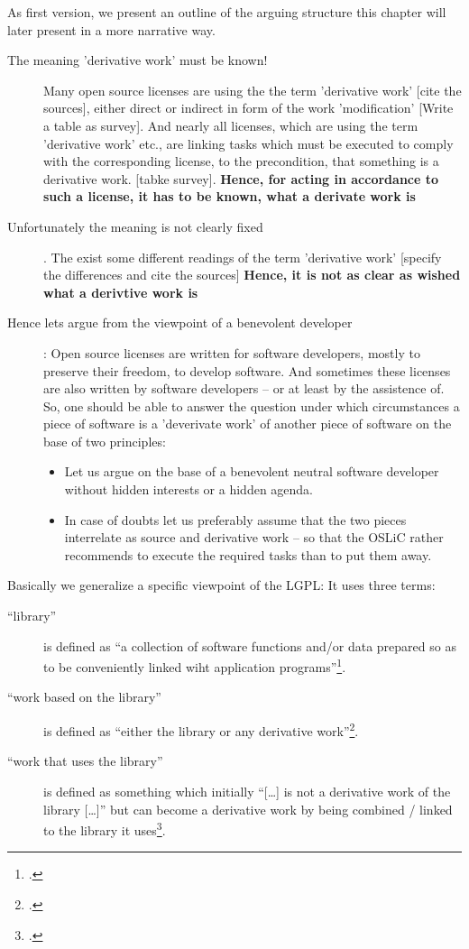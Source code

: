 As first version, we present an outline of the arguing structure this chapter
will later present in a more narrative way.

\begin{description}
  \item[The meaning 'derivative work' must be known!] Many open source licenses
  are using the the term 'derivative work'  [cite the sources], either direct or
  indirect in form of the work 'modification' [Write a table as survey]. And
  nearly all licenses, which are using the term 'derivative work' etc., are
  linking tasks which must be executed to comply with the corresponding license,
  to the precondition, that something is a derivative work.
  [tabke survey]. \textbf{Hence, for acting in accordance to such a license, it
  has to be known, what a derivate work is}
  \item[Unfortunately the meaning is not clearly fixed]. The exist some
  different readings of the term 'derivative work' [specify the differences and
  cite the sources] \textbf{Hence, it is not as clear as wished what a derivtive
  work is}
  \item[Hence lets argue from the viewpoint of a benevolent developer]: Open
  source licenses are written for software developers, mostly to preserve their
  freedom, to develop software. And sometimes these licenses are also written by
  software developers -- or at least by the assistence of. So, one should be
  able to answer the question under which circumstances a piece of software is a
  'deverivate work' of another piece of software on the base of two principles:
  \begin{itemize}
  \item Let us argue on the base of a benevolent neutral software developer
  without hidden interests or a hidden agenda.
  \item In case of doubts let us preferably assume that the two pieces
  interrelate as source and derivative work -- so that the OSLiC rather recommends
  to execute the required tasks than to put them away.
\end{itemize}
\end{description}

Basically we generalize a specific viewpoint of the LGPL: It uses three terms:

\begin{description}
  \item[\enquote{library}] is defined as \enquote{a collection of software
  functions and/or data prepared so as to be conveniently linked wiht
  application programs}\footcite[cf.][\nopage wp §0]{Lgpl21OsiLicense1999a}.
  \item[\enquote{work based on the library}] is defined as \enquote{either the
  library or any derivative work}\footcite[cf.][\nopage wp
  §0]{Lgpl21OsiLicense1999a}.
  \item[\enquote{work that uses the library}] is defined as something which
  initially \enquote{[\ldots] is not a derivative work of the library [\ldots]}
  but can become a derivative work by being combined / linked to the library it
  uses\footcite[cf.][\nopage wp §5]{Lgpl21OsiLicense1999a}.
\end{description}

